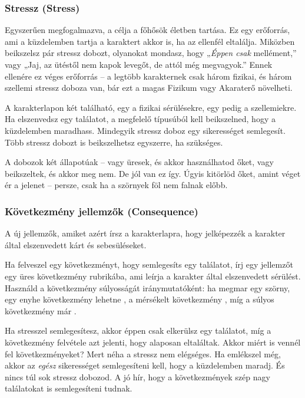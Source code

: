 \subsubsection[Stressz]{Stressz (Stress)}

Egyszerűen megfogalmazva, a  célja a főhősök életben tartása. Ez egy erőforrás, ami a küzdelemben tartja a karaktert akkor is, ha az ellenfél eltalálja. Miközben beikszelsz pár stressz dobozt, olyanokat mondasz, hogy „\emph{Éppen csak} mellément,” vagy „Jaj, az ütéstől nem kapok levegőt, de attól még megvagyok.” Ennek ellenére ez véges erőforrás -- a legtöbb karakternek csak három fizikai, és három szellemi stressz doboza van, bár ezt a magas Fizikum vagy Akaraterő növelheti.

A karakterlapon két  található, egy a fizikai sérülésekre, egy pedig a szellemiekre. Ha elszenvedsz egy találatot, a megfelelő típusúból kell beikszelned, hogy a küzdelemben maradhass. Mindegyik stressz doboz egy sikerességet semlegesít. Több stressz dobozt is beikszelhetsz egyszerre, ha szükséges.

A dobozok két állapotúak -- vagy üresek, és akkor használhatod őket, vagy beikszeltek, és akkor meg nem. De jól van ez így. Úgyis kitörlöd őket, amint véget ér a jelenet -- persze, csak ha a szörnyek föl nem falnak előbb.

\subsubsection[Következmény jellemzők]{Következmény jellemzők (Consequence)}

A  új jellemzők, amiket azért írsz a karakterlapra, hogy jelképezzék a karakter által elszenvedett kárt és sebesüléseket.

Ha felveszel egy következményt, hogy semlegesíts egy találatot, írj egy jellemzőt egy üres következmény rubrikába, ami leírja a karakter által elszenvedett sérülést. Használd a következmény súlyosságát iránymutatóként: ha megmar egy szörny, egy enyhe következmény lehetne , a mérsékelt következmény , míg a súlyos következmény már .

Ha stresszel semlegesítesz, akkor éppen csak elkerülsz egy találatot, míg a következmény felvétele azt jelenti, hogy alaposan eltaláltak. Akkor miért is vennél fel következményeket? Mert néha a stressz nem elégséges. Ha emlékszel még, akkor az \emph{egész} sikerességet semlegesíteni kell, hogy a küzdelemben maradj. És nincs túl sok stressz dobozod. A jó hír, hogy a következmények szép nagy találatokat is semlegesíteni tudnak.

